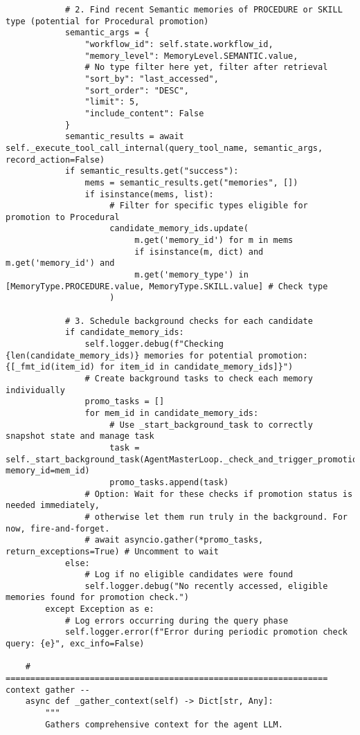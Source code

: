 \documentclass[12pt,a4paper]{article}
\begin{document}
\begin{pageablecode}
\begin{verbatim}
            # 2. Find recent Semantic memories of PROCEDURE or SKILL type (potential for Procedural promotion)
            semantic_args = {
                "workflow_id": self.state.workflow_id,
                "memory_level": MemoryLevel.SEMANTIC.value,
                # No type filter here yet, filter after retrieval
                "sort_by": "last_accessed",
                "sort_order": "DESC",
                "limit": 5,
                "include_content": False
            }
            semantic_results = await self._execute_tool_call_internal(query_tool_name, semantic_args, record_action=False)
            if semantic_results.get("success"):
                mems = semantic_results.get("memories", [])
                if isinstance(mems, list):
                     # Filter for specific types eligible for promotion to Procedural
                     candidate_memory_ids.update(
                          m.get('memory_id') for m in mems
                          if isinstance(m, dict) and m.get('memory_id') and
                          m.get('memory_type') in [MemoryType.PROCEDURE.value, MemoryType.SKILL.value] # Check type
                     )

            # 3. Schedule background checks for each candidate
            if candidate_memory_ids:
                self.logger.debug(f"Checking {len(candidate_memory_ids)} memories for potential promotion: {[_fmt_id(item_id) for item_id in candidate_memory_ids]}")
                # Create background tasks to check each memory individually
                promo_tasks = []
                for mem_id in candidate_memory_ids:
                     # Use _start_background_task to correctly snapshot state and manage task
                     task = self._start_background_task(AgentMasterLoop._check_and_trigger_promotion, memory_id=mem_id)
                     promo_tasks.append(task)
                # Option: Wait for these checks if promotion status is needed immediately,
                # otherwise let them run truly in the background. For now, fire-and-forget.
                # await asyncio.gather(*promo_tasks, return_exceptions=True) # Uncomment to wait
            else:
                # Log if no eligible candidates were found
                self.logger.debug("No recently accessed, eligible memories found for promotion check.")
        except Exception as e:
            # Log errors occurring during the query phase
            self.logger.error(f"Error during periodic promotion check query: {e}", exc_info=False)

    # ================================================================= context gather --
    async def _gather_context(self) -> Dict[str, Any]:
        """
        Gathers comprehensive context for the agent LLM.


\end{verbatim}
\end{pageablecode}
\end{document}
